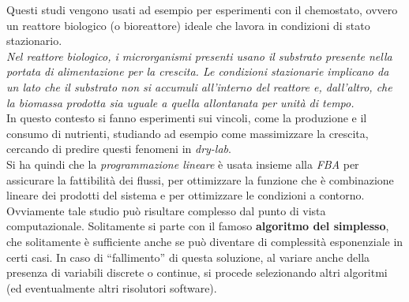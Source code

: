 \documentclass[a4paper,12pt, oneside]{book}
\begin{document}
Questi studi vengono usati ad esempio per esperimenti con il
\textnormal{chemostato}, ovvero un reattore biologico (o bioreattore) ideale che
lavora in condizioni di stato stazionario.\\
\textit{Nel reattore biologico, i microrganismi presenti usano il substrato
  presente nella portata di alimentazione per la crescita. Le condizioni
  stazionarie implicano da un lato che il substrato non si accumuli all'interno
  del reattore e, dall'altro, che la biomassa prodotta sia uguale a quella
  allontanata per unità di tempo.}\\
In questo contesto si fanno esperimenti sui vincoli, come la produzione e il
consumo di nutrienti, studiando ad esempio come massimizzare la crescita,
cercando di predire questi fenomeni in \textit{dry-lab}.\\
Si ha quindi che la \textit{programmazione lineare} è usata insieme alla
\textit{FBA} per assicurare la fattibilità dei flussi, per ottimizzare la
funzione che è combinazione lineare dei prodotti del sistema e per ottimizzare
le condizioni a contorno. Ovviamente tale studio può risultare complesso dal
punto di vista computazionale. Solitamente si parte con il famoso
\textbf{algoritmo del simplesso}, che solitamente è sufficiente anche se può
diventare di complessità esponenziale in certi casi. In caso di ``fallimento''
di questa soluzione, al variare anche della presenza di variabili discrete o
continue, si procede selezionando altri algoritmi (ed eventualmente altri
risolutori software).
\end{document}
